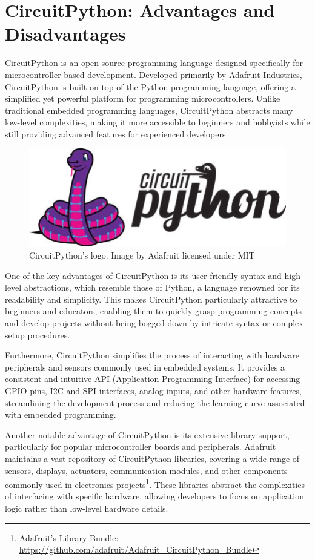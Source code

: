 \section{CircuitPython: Advantages and Disadvantages}

CircuitPython is an open-source programming language designed specifically for 
microcontroller-based development. Developed primarily by Adafruit Industries, CircuitPython is 
built on top of the Python programming language, offering a simplified yet powerful platform for 
programming microcontrollers. Unlike traditional embedded programming languages, CircuitPython 
abstracts many low-level complexities, making it more accessible to beginners and hobbyists while 
still providing advanced features for experienced developers.

\begin{figure}[h]
	\centering
	\includegraphics[width = .5\textwidth]{Imagenes/Vectorial/circuitpython_logo.pdf}
	\caption{CircuitPython's logo. Image by Adafruit licensed under MIT}
	\label{fig:circuitpython_logo}
\end{figure}

One of the key advantages of CircuitPython is its user-friendly syntax and high-level abstractions, 
which resemble those of Python, a language renowned for its readability and simplicity. This makes 
CircuitPython particularly attractive to beginners and educators, enabling them to quickly grasp 
programming concepts and develop projects without being bogged down by intricate syntax or complex 
setup procedures.

Furthermore, CircuitPython simplifies the process of interacting with hardware peripherals and 
sensors commonly used in embedded systems. It provides a consistent and intuitive API (Application 
Programming Interface) for accessing GPIO pins, I2C and SPI interfaces, analog inputs, and other 
hardware features, streamlining the development process and reducing the learning curve associated 
with embedded programming.

Another notable advantage of CircuitPython is its extensive library support, particularly for 
popular microcontroller boards and peripherals. Adafruit maintains a vast repository of 
CircuitPython libraries, covering a wide range of sensors, displays, actuators, communication 
modules, and other components commonly used in electronics projects\footnote{Adafruit's Library 
Bundle: \url{https://github.com/adafruit/Adafruit_CircuitPython_Bundle}}. These libraries abstract 
the complexities of interfacing with specific hardware, allowing developers to focus on application 
logic rather than low-level hardware details.

